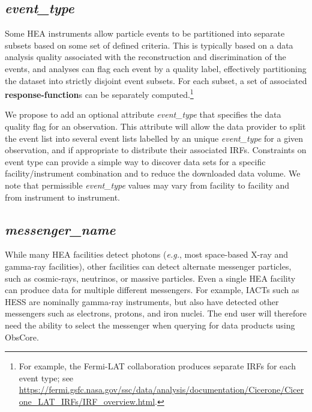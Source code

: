 \documentclass[11pt,a4paper]{ivoa}
\begin{document}
\subsection{{\em event\_type}}
\label{sec:evttype}

Some \gls{HEA} instruments allow particle events to be partitioned into separate subsets based on some set of defined criteria.  This is typically based on a data analysis quality associated with the reconstruction and  discrimination of the events, and analyses can flag each event by a quality label, effectively partitioning the dataset into strictly disjoint event subsets. For each subset, a set of associated {\bf response-function}s can be separately computed.\footnote{For example, the Fermi-LAT collaboration produces separate \glspl{IRF} for each event type; see \url{https://fermi.gsfc.nasa.gov/ssc/data/analysis/documentation/Cicerone/Cicerone_LAT_IRFs/IRF_overview.html}.}

We propose to add an optional attribute {\em event\_type\/} that specifies the data quality flag for an observation. This attribute will allow the data provider to split the event list into several event lists labelled by an unique {\em event\_type\/} for a given observation, and if appropriate to distribute their associated \glspl{IRF}. Constraints on event type can provide a simple way to discover data sets for a specific facility/instrument combination and to reduce the downloaded data volume. We note that permissible {\em event\_type\/} values may vary from facility to facility and from instrument to instrument.


\subsection{{\em messenger\_name}}
\label{sec:messenger}

While many \gls{HEA} facilities detect photons ({\em e.g.\/}, most space-based X-ray and gamma-ray facilities), other facilities can detect alternate messenger particles, such as cosmic-rays, neutrinos, or massive particles.  Even a single \gls{HEA} facility can produce data for multiple different messengers.  For example, \gls{IACT}s such as \gls{HESS} are nominally gamma-ray instruments, but also have detected other messengers such as electrons, protons, and iron nuclei. The end user will therefore need the ability to select the messenger when querying for data products using Obs\-Core.
\end{document}
